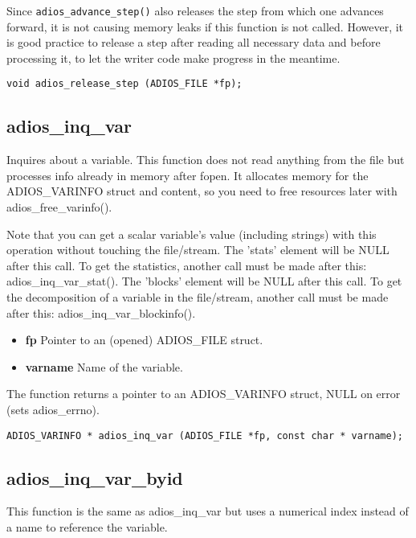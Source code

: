Since \verb+adios_advance_step()+ also releases the step from which one advances 
forward, it is not causing memory leaks if this function is not called. However, it is good practice to release a step after reading all necessary data and before processing it, to let the writer code make progress in the meantime.

\begin{lstlisting}[alsolanguage=C]
void adios_release_step (ADIOS_FILE *fp);
\end{lstlisting}

\subsection{adios\_inq\_var}
\label{section:read_api_adios_inq_var}
Inquires about a variable.
This function does not read anything from the file but processes info
already in memory after fopen.
It allocates memory for the ADIOS\_VARINFO struct and content, so
you need to free resources later with adios\_free\_varinfo().

Note that you can get a scalar variable's value (including strings)
with this operation without touching the file/stream.
The 'stats' element will be NULL after this call. To get the statistics, 
another call must be made after this: adios\_inq\_var\_stat().
The 'blocks' element will be NULL after this call. To get the decomposition
of a variable in the file/stream, another call must be made after this: 
adios\_inq\_var\_blockinfo().

\begin{itemize}
 \item{\bf fp} Pointer to an (opened) ADIOS\_FILE struct.
\item{\bf varname}  Name of the variable.
\end{itemize}

\noindent The function returns a pointer to an ADIOS\_VARINFO struct, NULL on error (sets adios\_errno).

\begin{lstlisting}[alsolanguage=C]
ADIOS_VARINFO * adios_inq_var (ADIOS_FILE *fp, const char * varname);

\end{lstlisting}

\subsection{adios\_inq\_var\_byid}
This function is the same as adios\_inq\_var but uses a numerical index instead of a name to reference the variable. 

